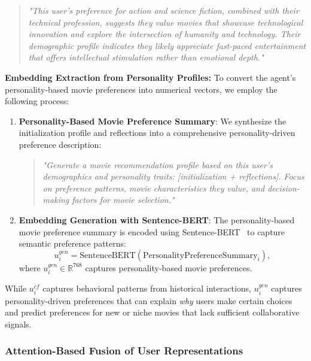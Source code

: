 \documentclass[acmsmall]{acmart}
\begin{document}
\begin{quote}
\textit{"This user's preference for action and science fiction, combined with their technical profession, suggests they value movies that showcase technological innovation and explore the intersection of humanity and technology. Their demographic profile indicates they likely appreciate fast-paced entertainment that offers intellectual stimulation rather than emotional depth."}
\end{quote}

\textbf{Embedding Extraction from Personality Profiles:} To convert the agent's personality-based movie preferences into numerical vectors, we employ the following process:

\begin{enumerate}
    \item \textbf{Personality-Based Movie Preference Summary}: We synthesize the initialization profile and reflections into a comprehensive personality-driven preference description:
    \begin{quote}
    \textit{"Generate a movie recommendation profile based on this user's demographics and personality traits: [initialization + reflections]. Focus on preference patterns, movie characteristics they value, and decision-making factors for movie selection."}
    \end{quote}
    
    \item \textbf{Embedding Generation with Sentence-BERT}: The personality-based movie preference summary is encoded using Sentence-BERT~\cite{reimers2019sentence} to capture semantic preference patterns:
    \begin{equation}
    u^{gen}_i = \text{SentenceBERT}(\text{PersonalityPreferenceSummary}_i),    \label{eq:personality_encoding}
    \end{equation}
    where $u^{gen}_i\in \mathbb{R}^{768}$ captures personality-based movie preferences.
    

\end{enumerate}

 While $u^{cf}_i$ captures behavioral patterns from historical interactions, $u^{gen}_i$ captures personality-driven preferences that can explain \textit{why} users make certain choices and predict preferences for new or niche movies that lack sufficient collaborative signals.

\subsubsection{Attention-Based Fusion of User Representations}
\label{sec:attention_fusion}
\end{document}

